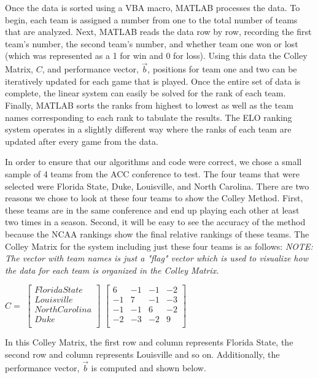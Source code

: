 \documentclass[12pt]{article}
\begin{document}
Once the data is sorted using a VBA macro, MATLAB processes the data. To begin, each team is assigned a number from one to the total number of teams that are analyzed. Next, MATLAB reads the data row by row, recording the first team's number, the second team's number, and whether team one won or lost (which was represented as a 1 for win and 0 for loss). Using this data the Colley Matrix, $C$, and performance vector, $\vec{b}$, positions for team one and two can be iteratively updated for each game that is played. Once the entire set of data is complete, the linear system can easily be solved for the rank of each team. Finally, MATLAB sorts the ranks from highest to lowest as well as the team names corresponding to each rank to tabulate the results. The ELO ranking system operates in a slightly different way where the ranks of each team are updated after every game from the data.

In order to ensure that our algorithms and code were correct, we chose a small sample of 4 teams from the ACC conference to test. The four teams that were selected were Florida State, Duke, Louisville, and North Carolina. There are two reasons we chose to look at these four teams to show the Colley Method. First, these teams are in the same conference and end up playing each other at least two times in a season. Second, it will be easy to see the accuracy of the method because the NCAA rankings show the final relative rankings of these teams. The Colley Matrix for the system including just these four teams is as follows:
\textit{NOTE: The vector with team names is just a "flag" vector which is used to visualize how the data for each team is organized in the Colley Matrix.}
\begin{center}
$C =$
$\begin{bmatrix}
Florida State\\
Louisville\\
North Carolina\\
Duke\\
\end{bmatrix}$
$\begin{bmatrix}
6&-1&-1&-2\\
-1&7&-1&-3\\
-1&-1&6&-2\\
-2&-3&-2&9\\
\end{bmatrix}$
\end{center}

In this Colley Matrix, the first row and column represents Florida State, the second row and column represents Louisville and so on. Additionally, the performance vector, $\vec{b}$ is computed and shown below.
\end{document}
